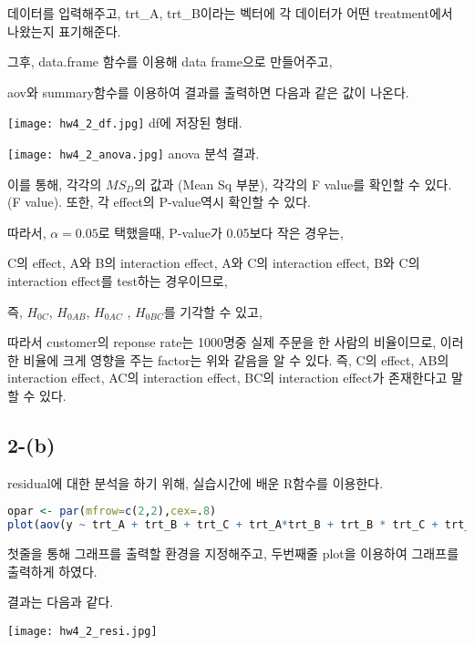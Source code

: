 \documentclass{article}
\begin{document}
데이터를 입력해주고, trt\_A, trt\_B이라는 벡터에 각 데이터가 어떤 treatment에서 나왔는지 표기해준다.

그후, data.frame 함수를 이용해 data frame으로 만들어주고, 

aov와 summary함수를 이용하여 결과를 출력하면 다음과 같은 값이 나온다.

\begin{center}
    \texttt{[image: hw4\_2\_df.jpg]}
df에 저장된 형태.
\end{center} 

\begin{center}
    \texttt{[image: hw4\_2\_anova.jpg]}
anova 분석 결과.
\end{center} 

이를 통해, 각각의 $MS_D$의 값과 (Mean Sq 부분), 각각의 F value를 확인할 수 있다. (F value).
또한, 각 effect의 P-value역시 확인할 수 있다.

따라서, $\alpha = 0.05$로 택했을때, P-value가 0.05보다 작은 경우는,

C의 effect, A와 B의 interaction effect, A와 C의 interaction effect, B와 C의 interaction effect를 test하는 경우이므로,

즉, $H_{0C}$,  $H_{0AB}$,  $H_{0AC}$ , $H_{0BC}$를 기각할 수 있고, 

따라서 customer의 reponse rate는 1000명중 실제 주문을 한 사람의 비율이므로, 이러한 비율에 크게 영향을 주는 factor는
위와 같음을 알 수 있다. 즉, C의 effect, AB의 interaction effect, AC의 interaction effect, BC의 interaction effect가 존재한다고 말할 수 있다.


\subsection{2-(b)}


residual에 대한 분석을 하기 위해, 실습시간에 배운 R함수를 이용한다.

\begin{lstlisting}[language=R]
opar <- par(mfrow=c(2,2),cex=.8)
plot(aov(y ~ trt_A + trt_B + trt_C + trt_A*trt_B + trt_B * trt_C + trt_A * trt_C + trt_A * trt_B * trt_C, data = df2))
\end{lstlisting}

첫줄을 통해 그래프를 출력할 환경을 지정해주고,
두번째줄 plot을 이용하여 그래프를 출력하게 하였다.

결과는 다음과 같다.

\begin{center}
    \texttt{[image: hw4\_2\_resi.jpg]}
\end{center} 
\end{document}
